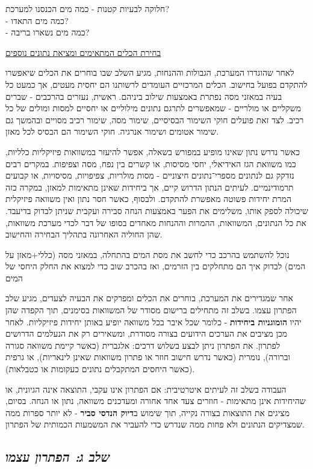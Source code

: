 \documentclass[
  hebrew,
  letterpaper,
  DIV=11,
  numbers=noendperiod]{scrreprt}
\begin{document}
חלוקה לבעיות קטנות - כמה מים הכנסנו למערכת?\\
- כמה מים התאדו?\\
- כמה מים נשארו בריבה?

\ul{בחירת הכלים המתאימים ומציאת נתונים נוספים}

לאחר שהוגדרו המערכת, הגבולות וההנחות, מגיע השלב שבו בוחרים את הכלים
שיאפשרו להתקדם בפועל בחישוב. הכלים המרכזיים העומדים לרשותנו הם יחסית
מעטים, אך כמעט כל בעיה במאזני מסה נפתרת באמצעות שילוב ביניהם. ראשית,
נעזרים בהרכבים - שברים משקליים או מולריים - שמאפשרים לתרגם נתונים
מילוליים או יחסיים למסות ומולים של כל רכיב. לצד זאת פועלים חוקי השימור
הבסיסיים, שימור מסה, שימור רכיב מסויים ובהמשך גם שימור אטומים ושימור
אנרגיה. חוקי השימור הם הבסיס לכל מאזן.

כאשר נדרש נתון שאינו מופיע במפורש בשאלה, אפשר להיעזר במשוואות פיזיקליות
כלליות, כמו משוואת הגז האידיאלי, יחסי מסיסות, או קשרים בין נפח, מסה
וצפיפות. במקרים רבים נזדקק גם לנתונים מספרי־נתונים חיצוניים - מסות
מולריות, צפיפויות, מסיסויות, או קבועים תרמודינמיים. לעיתים הנתון הדרוש
קיים, אך ביחידות שאינן מתאימות למאזן, במקרה כזה המרת יחידות פשוטה מאפשרת
להתקדם. ולבסוף, כאשר חסר נתון ואין משוואה פיזיקלית שיכולה לספק אותו,
משלימים את הפער באמצעות הנחה סבירה ועקבית שניתן לבדוק בדיעבד. את כל
הנתונים, המשוואות, ההמרות וההנחות מאחדים בסופו של דבר לכדי מערכת
משוואות, שהן החוליה האחרונה בתהליך הבחירה והחישוב.

נוכל להשתמש בהרכב כדי לחשב את מסת המים בהתחלה, במאזני מסה (כללי+מאזן על
המים) לבדוק איך הם מתחלקים בין הזרמים, ואז בהכרב שוב כדי למצוא את החלק
היחסי של המים

אחר שמגדירים את המערכת, בוחרים את הכלים ומפרקים את הבעיה לצעדים, מגיע
שלב הפתרון עצמו. בשלב זה מתחילים ברישום מסודר של המשוואות בסימנים, תוך
הקפדה שהן יהיו \textbf{הומוגניות ביחידות} - כלומר שכל איבר בכל משוואה
יופיע באותן יחידות פיזיקליות. לאחר מכן מציבים את הערכים הידועים בצורה
מסודרת, ומשאירים רק את הנעלמים הדרושים לפתרון. את הפתרון ניתן לבצע בשלוש
דרכים: אלגברית (כאשר קיימת משוואה סגורה וברורה), נומרית (כאשר נדרש חישוב
חוזר או פתרון משוואות שאינן לינאריות), או גרפית (כאשר היחסים המתקבלים
נתונים כעקומות או כטבלאות).

העבודה בשלב זה לעיתים איטרטיבית: אם הפתרון אינו עקבי, התוצאה אינה
הגיונית, או שהיחידות אינן מתאימות - חוזרים צעד אחד אחורה ומעדכנים
משוואה, נתון או הנחה. בסיום, מציגים את התוצאות בצורה נקייה, תוך שימוש
ב\textbf{דיוק הנדסי סביר} - לא יותר ספרות ממה שמצדיקים הנתונים ולא פחות
ממה שנדרש כדי להעביר את המשמעות הכמותית של הפתרון.

\subsection{\texorpdfstring{\emph{שלב ג: הפתרון
עצמו}}{שלב ג: הפתרון עצמו}}\label{ux5e9ux5dcux5d1-ux5d2-ux5d4ux5e4ux5eaux5e8ux5d5ux5df-ux5e2ux5e6ux5deux5d5}
\end{document}
